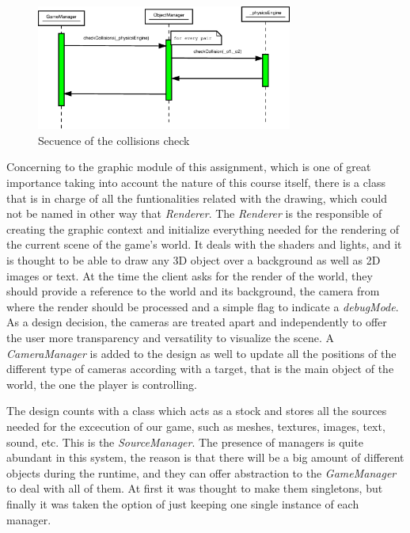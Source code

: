 \documentclass[]{article}
\begin{document}
\begin{figure}[h]
\begin{center}
\includegraphics[width=0.75\textwidth]{images/physicsEngineSec.eps}
\caption{Secuence of the collisions check}
\label{fig:pesec}
\end{center}
\end{figure}

Concerning to the graphic module of this assignment, which is one of great importance taking into account the nature of this course itself, there is a class that is in charge of all the funtionalities
related with the drawing, which could not be named in other way that \emph{Renderer}. The \emph{Renderer} is the responsible of creating the graphic context and initialize everything needed for the
rendering of the current scene of the game's world. It deals with the shaders and lights, and it is thought to be able to draw any 3D object over a background as well as 2D images or text. At the time 
the client asks for the render of the world, they should provide a reference to the world and its background, the camera from where the render should be processed and a simple flag to indicate a \emph{debugMode}.
As a design decision, the cameras are treated apart and independently to offer the user more transparency and versatility to visualize the scene. A \emph{CameraManager} is added to the design as well to
update all the positions of the different type of cameras according with a target, that is the main object of the world, the one the player is controlling.

The design counts with a class which acts as a stock and stores all the sources needed for the excecution of our game, such as meshes, textures, images, text, sound, etc. This is the 
\emph{SourceManager}. The presence of managers is quite abundant in this system, the reason is that there will be a big amount of different objects during the runtime, and they can offer abstraction
to the \emph{GameManager} to deal with all of them. At first it was thought to make them singletons, but finally it was taken the option of just keeping one single instance of each manager.
\end{document}
